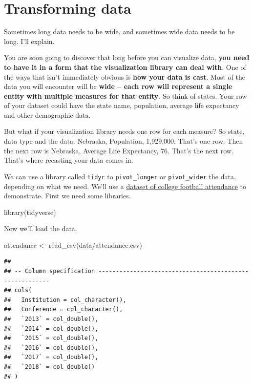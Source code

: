 \documentclass[
]{book}
\newenvironment{Shaded}{\begin{snugshade}}{\end{snugshade}}
\newcommand{\FunctionTok}[1]{\textcolor[rgb]{0.00,0.00,0.00}{#1}}
\newcommand{\NormalTok}[1]{#1}
\newcommand{\OtherTok}[1]{\textcolor[rgb]{0.56,0.35,0.01}{#1}}
\newcommand{\StringTok}[1]{\textcolor[rgb]{0.31,0.60,0.02}{#1}}
\begin{document}
\hypertarget{transforming-data}{%
\chapter{Transforming data}\label{transforming-data}}

Sometimes long data needs to be wide, and sometimes wide data needs to be long. I'll explain.

You are soon going to discover that long before you can visualize data, \textbf{you need to have it in a form that the visualization library can deal with}. One of the ways that isn't immediately obvious is \textbf{how your data is cast}. Most of the data you will encounter will be \textbf{wide -- each row will represent a single entity with multiple measures for that entity}. So think of states. Your row of your dataset could have the state name, population, average life expectancy and other demographic data.

But what if your visualization library needs one row for each measure? So state, data type and the data. Nebraska, Population, 1,929,000. That's one row. Then the next row is Nebraska, Average Life Expectancy, 76. That's the next row. That's where recasting your data comes in.

We can use a library called \texttt{tidyr} to \texttt{pivot\_longer} or \texttt{pivot\_wider} the data, depending on what we need. We'll use a \href{https://unl.box.com/s/oajabnn5614s22jstgcd9ojxo2njn6jt}{dataset of college football attendance} to demonstrate. First we need some libraries.

\begin{Shaded}
\begin{Highlighting}[]
\FunctionTok{library}\NormalTok{(tidyverse)}
\end{Highlighting}
\end{Shaded}

Now we'll load the data.

\begin{Shaded}
\begin{Highlighting}[]
\NormalTok{attendance }\OtherTok{\textless{}{-}} \FunctionTok{read\_csv}\NormalTok{(}\StringTok{\textquotesingle{}data/attendance.csv\textquotesingle{}}\NormalTok{)}
\end{Highlighting}
\end{Shaded}

\begin{verbatim}
## 
## -- Column specification --------------------------------------------------------
## cols(
##   Institution = col_character(),
##   Conference = col_character(),
##   `2013` = col_double(),
##   `2014` = col_double(),
##   `2015` = col_double(),
##   `2016` = col_double(),
##   `2017` = col_double(),
##   `2018` = col_double()
## )
\end{verbatim}
\end{document}
